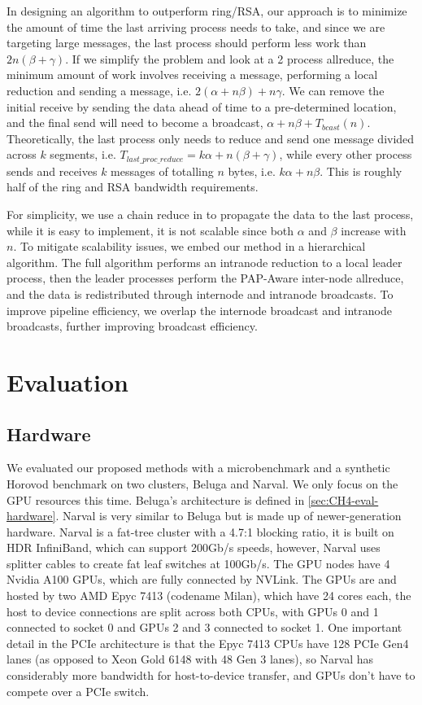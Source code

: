 In designing an algorithm to outperform ring/RSA, our approach is to minimize the amount of time the last arriving process needs to take, and since we are targeting large messages, the last process should perform less work than $2n(\beta+\gamma)$. 
If we simplify the problem and look at a 2 process allreduce, the minimum amount of work involves receiving a message, performing a local reduction and sending a message, i.e. $2(\alpha+n\beta)+n\gamma$.
We can remove the initial receive by sending the data ahead of time to a pre-determined location, and the final send will need to become a broadcast, $\alpha+n\beta+T_{bcast}(n)$. 
Theoretically, the last process only needs to reduce and send one message divided across $k$ segments, i.e. $T_{last\_proc\_reduce}=k\alpha+n(\beta+\gamma)$, while every other process sends and receives $k$ messages of totalling $n$ bytes, i.e. $k\alpha+n\beta$.
This is roughly half of the ring and RSA bandwidth requirements.

For simplicity, we use a chain reduce in to propagate the data to the last process, while it is easy to implement, it is not scalable since both $\alpha$ and $\beta$ increase with $n$.
To mitigate scalability issues, we embed our method in a hierarchical algorithm. 
The full algorithm performs an intranode reduction to a local leader process, then the leader processes perform the PAP-Aware inter-node allreduce, and the data is redistributed through internode and intranode broadcasts.
To improve pipeline efficiency, we overlap the internode broadcast and intranode broadcasts, further improving broadcast efficiency.

\section{Evaluation}
\subsection{Hardware}
We evaluated our proposed methods with a microbenchmark and a synthetic Horovod benchmark on two clusters, Beluga and Narval.
We only focus on the GPU resources this time.
Beluga's architecture is defined in \ref{sec:CH4-eval-hardware}.
Narval is very similar to Beluga but is made up of newer-generation hardware.
Narval is a fat-tree cluster with a 4.7:1 blocking ratio, it is built on HDR InfiniBand, which can support 200Gb/s speeds, however, Narval uses splitter cables to create fat leaf switches at 100Gb/s.
The GPU nodes have 4 Nvidia A100 GPUs, which are fully connected by NVLink.
The GPUs are and hosted by two AMD Epyc 7413 (codename Milan), which have 24 cores each, the host to device connections are split across both CPUs, with GPUs 0 and 1 connected to socket 0 and GPUs 2 and 3 connected to socket 1. 
One important detail in the PCIe architecture is that the Epyc 7413 CPUs have 128 PCIe Gen4 lanes (as opposed to Xeon Gold 6148 with 48 Gen 3 lanes), so Narval has considerably more bandwidth for host-to-device transfer, and GPUs don't have to compete over a PCIe switch.

